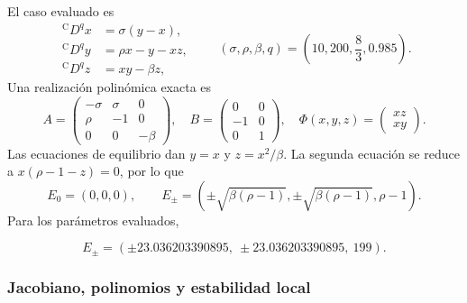 El caso evaluado es
\begin{equation}
\begin{aligned}
 {}^{\mathrm C}D^q x&=\sigma(y-x),\\
 {}^{\mathrm C}D^q y&=\rho x-y-xz,\\
 {}^{\mathrm C}D^q z&=xy-\beta z,
\end{aligned}
\qquad
(\sigma,\rho,\beta,q)=\left(10,200,\frac83,0.985\right).
\label{ncbench:eq:lorenz-standard}
\end{equation}
Una realización polinómica exacta es
\begin{equation}
 A=\begin{pmatrix}-\sigma&\sigma&0\\ \rho&-1&0\\0&0&-\beta\end{pmatrix},
 \quad
 B=\begin{pmatrix}0&0\\-1&0\\0&1\end{pmatrix},
 \quad
 \Phi(x,y,z)=\begin{pmatrix}xz\\xy\end{pmatrix}.
\end{equation}
Las ecuaciones de equilibrio dan \(y=x\) y \(z=x^2/\beta\). La segunda
ecuación se reduce a \(x(\rho-1-z)=0\), por lo que
\begin{equation}
 E_0=(0,0,0),\qquad
 E_{\pm}=\left(\pm\sqrt{\beta(\rho-1)},
 \pm\sqrt{\beta(\rho-1)},\rho-1\right).
\end{equation}
Para los parámetros evaluados,

\[
 E_{\pm}=(\pm23.036203390895,\ \pm23.036203390895,\ 199).
\]

\subsubsection*{Jacobiano, polinomios y estabilidad local}


